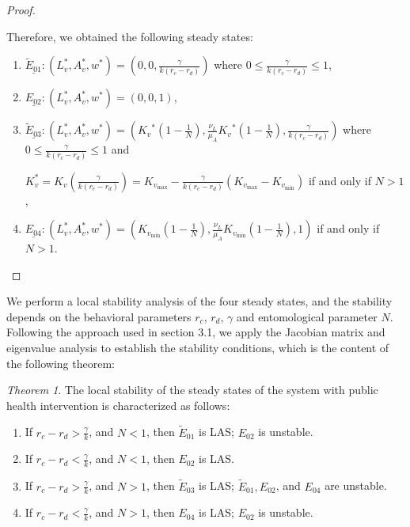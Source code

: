 \documentclass{article}
\theoremstyle{remark}
\theoremstyle{custom} %
\newtheorem{theorem}{Theorem}
\begin{document}
\begin{proof}
\begin{itemize}
\end{itemize}

Therefore, we obtained the following  steady states:

\begin{enumerate}

\item $\underline{\tilde{E}_{01}}:\left(L_v^*, A_v^*, w^*\right)=\left(0,0, \frac{\gamma}{k\left(r_c-r_d\right)}\right)$ where $0 \leq \frac{\gamma}{k\left(r_c-r_d\right)} \leq 1$,

\item $\underline{E_{02}}:\left(L_v^*, A_v^*, w^*\right)=(0,0,1)$,

\item $\underline{\tilde{E}_{03}}:\left(L_v^*, A_v^*, w^*\right)=\left(K_v{ }^*\left(1-\frac{1}{N}\right), \frac{\nu_L}{\mu_A} K_v{ }^*\left(1-\frac{1}{N}\right), \frac{\gamma}{k\left(r_c-r_d\right)}\right)$ where $0 \leq \frac{\gamma}{k\left(r_c-r_d\right)} \leq 1$ and

$K_v^*=K_v\left(\frac{\gamma}{k\left(r_e-r_d\right)}\right)=K_{v_{\text {max}}}-\frac{\gamma}{k\left(r_e-r_d\right)}\left(K_{v_{\text {max}}}-K_{v_{\text {min}}}\right)$ if and only if $N>1$,

\item $\underline{E_{04}}:\left(L_v^*, A_v^*, w^*\right)=\left(K_{v_{\min }}\left(1-\frac{1}{N}\right), \frac{\nu_L}{\mu_A} K_{v_{\min }}\left(1-\frac{1}{N}\right), 1\right)$ if and only if $N>1$.

\end{enumerate}
\end{proof}

We perform a local stability analysis of the four steady states, and the stability depends on the behavioral parameters \( r_c \), \( r_d \), $\gamma$ and entomological parameter $N$. Following the approach used in section 3.1, we apply the Jacobian matrix and eigenvalue analysis to establish the stability conditions, which is the content of the following theorem:

\begin{theorem}
The local stability of the steady states of the system with public health intervention is characterized as follows:
\begin{enumerate}

\item If $r_c-r_d>\frac{\gamma}{k}$, and $N<1$, then $\tilde{E}_{01}$ is LAS; $E_{02}$ is unstable.

\item If $r_c-r_d<\frac{\gamma}{k}$, and $N<1$, then $E_{02}$ is LAS.

\item If $r_c-r_d>\frac{\gamma}{k}$, and $N>1$, then $\tilde{E}_{03}$ is LAS; $\tilde{E}_{01}, E_{02}$, and $E_{04}$ are unstable.

\item If $r_c-r_d<\frac{\gamma}{k}$, and $N>1$, then $E_{04}$ is LAS; $E_{02}$ is unstable.

\end{enumerate}
\label{thm:Model with PH Intervention1}
\end{theorem}
\end{document}
